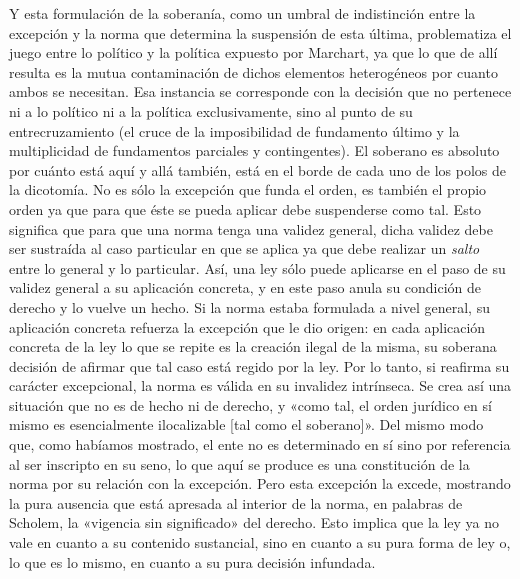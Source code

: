 Y esta formulación de la soberanía, como un umbral de indistinción entre la excepción y la norma que determina la suspensión de esta última, problematiza el juego entre lo político y la política expuesto por Marchart, ya que lo que de allí resulta es la mutua contaminación de dichos elementos heterogéneos por cuanto ambos se necesitan. Esa instancia se corresponde con la decisión que no pertenece ni a lo político ni a la política exclusivamente, sino al punto de su entrecruzamiento (el cruce de la imposibilidad de fundamento último y la multiplicidad de fundamentos parciales y contingentes). El soberano es absoluto por cuánto está aquí y allá también, está en el borde de cada uno de los polos de la dicotomía. No es sólo la excepción que funda el orden, es también el propio orden ya que para que éste se pueda aplicar debe suspenderse como tal. Esto significa que para que una norma tenga una validez general, dicha validez debe ser sustraída al caso particular en que se aplica ya que debe realizar un \emph{salto }entre lo general y lo particular. Así, una ley sólo puede aplicarse en el paso de su validez general a su aplicación concreta, y en este paso anula su condición de derecho y lo vuelve un hecho. Si la norma estaba formulada a nivel general, su aplicación concreta refuerza la excepción que le dio origen: en cada aplicación concreta de la ley lo que se repite es la creación ilegal de la misma, su soberana decisión de afirmar que tal caso está regido por la ley. Por lo tanto, si reafirma su carácter excepcional, la norma es válida en su invalidez intrínseca. Se crea así una situación que no es de hecho ni de derecho, y «como tal, el orden jurídico en sí mismo es esencialmente ilocalizable {[}tal como el soberano{]}». Del mismo modo que, como habíamos mostrado, el ente no es determinado en sí sino por referencia al ser inscripto en su seno, lo que aquí se produce es una constitución de la norma por su relación con la excepción. Pero esta excepción la excede, mostrando la pura ausencia que está apresada al interior de la norma, en palabras de Scholem, la «vigencia sin significado» del derecho. Esto implica que la ley ya no vale en cuanto a su contenido sustancial, sino en cuanto a su pura forma de ley o, lo que es lo mismo, en cuanto a su pura decisión infundada.

